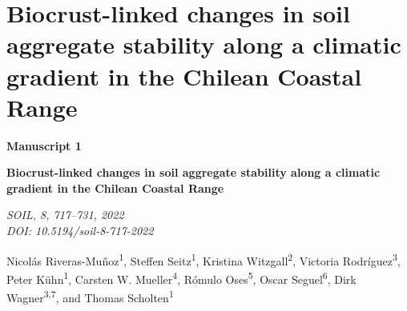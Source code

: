 
\chapter{Biocrust-linked changes in soil aggregate stability along a climatic gradient in the Chilean Coastal Range}

\label{chap:manuscript1} %

\begin{center}
    \textbf{\Large Manuscript 1}
\end{center} 

\vspace{0.1cm}

\begin{center}
    \textbf{\huge Biocrust-linked changes in soil aggregate stability along a climatic gradient in the Chilean Coastal Range}
\end{center}

\vspace{0.2cm}

\begin{center}
    \textit{SOIL, 8, 717–731, 2022}\\
    \textit{DOI: 10.5194/soil-8-717-2022}
\end{center}

\vspace{0.1cm}

\begin{justify}

    Nicolás Riveras-Muñoz\textsuperscript{1}, Steffen Seitz\textsuperscript{1}, Kristina Witzgall\textsuperscript{2}, Victoria Rodríguez\textsuperscript{3}, Peter Kühn\textsuperscript{1}, Carsten W. Mueller\textsuperscript{4}, Rómulo Oses\textsuperscript{5}, Oscar Seguel\textsuperscript{6}, Dirk Wagner\textsuperscript{3,7}, and Thomas Scholten\textsuperscript{1}

    \vspace{0.2cm}
\end{justify}

